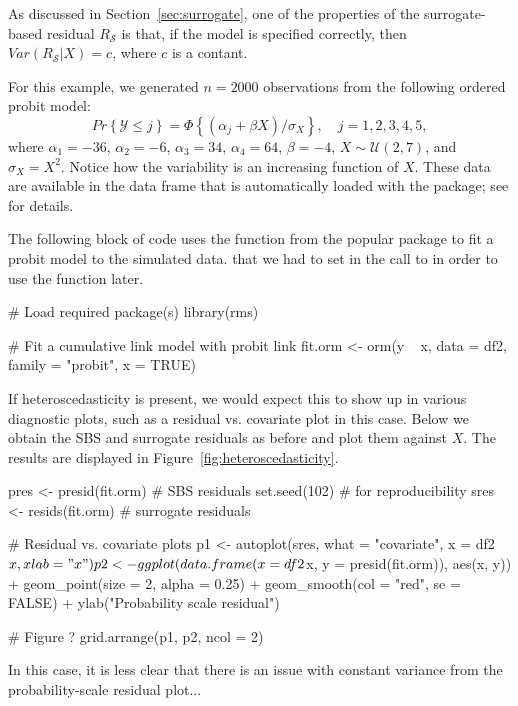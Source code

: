 As discussed in Section~\ref{sec:surrogate}, one of the properties of the surrogate-based residual $R_\mathcal{S}$ is that, if the model is specified correctly, then $Var\left(R_\mathcal{S} | X\right) = c$, where $c$ is a contant.

For this example, we generated $n = 2000$ observations from the following ordered probit model:
\begin{equation*}
  Pr\left\{\mathcal{Y} \le j\right\} = \Phi\left\{\left(\alpha_j + \beta X\right) / \sigma_X\right\}, \quad j = 1, 2, 3, 4, 5,
\end{equation*}
where $\alpha_1 = -36$, $\alpha_2 = -6$, $\alpha_3 = 34$, $\alpha_4 = 64$, $\beta = -4$, $X \sim \mathcal{U}\left(2, 7\right)$, and $\sigma_X = X ^ 2$.
Notice how the variability is an increasing function of $X$. These data are available in the  data frame that is automatically loaded with the  package; see  for details.

The following block of code uses the  function from the popular  package to fit a probit model to the simulated data.  that we had to set  in the call to  in order to use the  function later.
\begin{example}
# Load required package(s)
library(rms)

# Fit a cumulative link model with probit link
fit.orm <- orm(y ~ x, data = df2, family = "probit", x = TRUE)
\end{example}

If heteroscedasticity is present, we would expect this to show up in various diagnostic plots, such as a residual vs. covariate plot in this case. Below we obtain the SBS and surrogate residuals as before and plot them against $X$. The results are displayed in Figure~\ref{fig:heteroscedasticity}.
\begin{example}
pres <- presid(fit.orm)  # SBS residuals
set.seed(102)  # for reproducibility
sres <- resids(fit.orm)  # surrogate residuals

# Residual vs. covariate plots
p1 <- autoplot(sres, what = "covariate", x = df2$x, xlab = "x")
p2 <- ggplot(data.frame(x = df2$x, y = presid(fit.orm)), aes(x, y)) +
  geom_point(size = 2, alpha = 0.25) +
  geom_smooth(col = "red", se = FALSE) +
  ylab("Probability scale residual")
  
# Figure ?
grid.arrange(p1, p2, ncol = 2)
\end{example}

 In this case, it is less clear that there is an issue with constant variance from the probability-scale residual plot...

